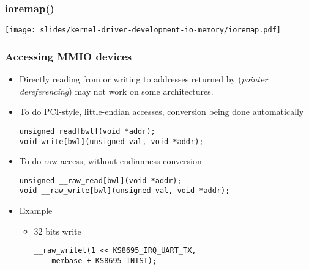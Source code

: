 \begin{frame}[fragile]
  \frametitle{ioremap()}
  \begin{center}
    \texttt{[image: slides/kernel-driver-development-io-memory/ioremap.pdf]}\\
  \end{center}
\end{frame}

\begin{frame}[fragile]
  \frametitle{Accessing MMIO devices}
  \begin{itemize}
  \item Directly reading from or writing to addresses returned by
     (\emph{pointer dereferencing}) may not work on some
    architectures.
  \item To do PCI-style, little-endian accesses, conversion being done
    automatically
\begin{verbatim}
unsigned read[bwl](void *addr);
void write[bwl](unsigned val, void *addr);
\end{verbatim}
  \item To do raw access, without endianness conversion
\begin{verbatim}
unsigned __raw_read[bwl](void *addr);
void __raw_write[bwl](unsigned val, void *addr);
\end{verbatim}
  \item Example
    \begin{itemize}
    \item 32 bits write
\begin{verbatim}
__raw_writel(1 << KS8695_IRQ_UART_TX,
    membase + KS8695_INTST);
\end{verbatim}
    \end{itemize}
  \end{itemize}
\end{frame}

